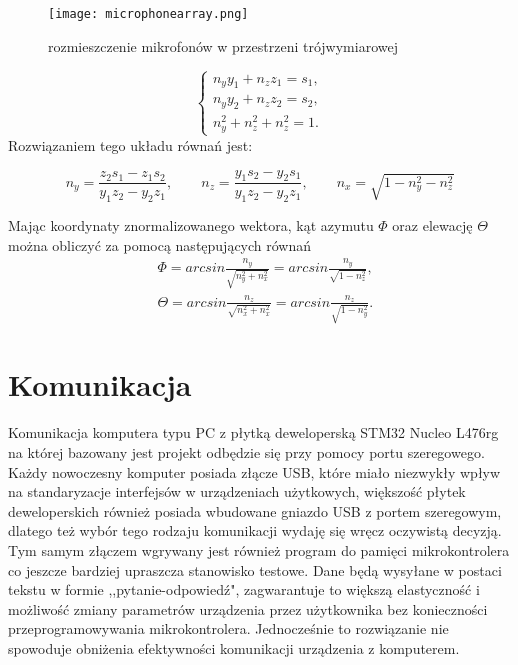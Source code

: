 \begin{figure}[ht!]
	\centering
	\texttt{[image: microphonearray.png]}
	\caption{rozmieszczenie mikrofonów w przestrzeni trójwymiarowej}
	\label{fig:micarray}
\end{figure}

\begin{equation}
	\begin{cases}
		n_y y_1 + n_z z_1 = s_1,\\
		n_y y_2 + n_z z_2 = s_2,\\
		n_y^2 + n_z^2 + n_z^2 = 1.	
	\end{cases}
\end{equation}
Rozwiązaniem tego układu równań jest:

\begin{equation}
	n_y= \frac{z_2s_1 - z_1s_2}{y_1z_2-y_2z_1},\qquad   n_z= \frac{y_1 s_2 - y_2 s_1}{y_1z_2-y_2 z_1}, \qquad  n_x= \sqrt{1-n_y^2-n_z^2}  
\end{equation}


Mając koordynaty znormalizowanego wektora, kąt azymutu $\Phi$ oraz elewację $\Theta$ można obliczyć za pomocą następujących równań
\begin{align}
	&\Phi = arcsin \frac{n_y}{\sqrt{n_y^2 +n_x^2}}= arcsin \frac{n_y}{\sqrt{1-n_z^2}},\\
	&\Theta = arcsin \frac{n_z}{\sqrt{n_x^2+n_x^2}}= arcsin \frac{n_z}{\sqrt{1-n_y^2}}.	
\end{align}






\section{Komunikacja}
Komunikacja komputera typu PC z płytką deweloperską STM32 Nucleo L476rg na której bazowany jest projekt odbędzie się przy pomocy portu szeregowego. 
Każdy nowoczesny komputer posiada złącze USB, które miało niezwykły wpływ na standaryzacje interfejsów w urządzeniach użytkowych, 
większość płytek deweloperskich również posiada wbudowane gniazdo USB z portem szeregowym, dlatego też wybór tego rodzaju komunikacji wydaję się wręcz oczywistą decyzją.
Tym samym złączem wgrywany jest również program do pamięci mikrokontrolera co jeszcze bardziej upraszcza stanowisko testowe.
Dane będą wysyłane w postaci tekstu w formie ,,pytanie-odpowiedź", 
zagwarantuje to większą elastyczność i możliwość zmiany parametrów urządzenia przez użytkownika bez konieczności przeprogramowywania mikrokontrolera.
Jednocześnie to rozwiązanie nie spowoduje obniżenia efektywności komunikacji urządzenia z komputerem. 



